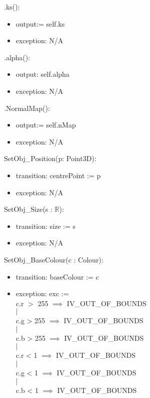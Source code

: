\documentclass[12pt, titlepage]{article}
\begin{document}
\noindent .ks():
\begin{itemize}
	\item output:= self.ks
	\item exception: N/A
\end{itemize}

\noindent .alpha():
\begin{itemize}
	\item output: self.alpha
	\item exception: N/A
\end{itemize}

\noindent .NormalMap():
\begin{itemize}
	\item output:= self.nMap
	\item exception: N/A
\end{itemize}
\noindent SetObj\_Position(p: Point3D):
\begin{itemize}
	\item transition: centrePoint := p
	\item exception: N/A
\end{itemize}

\noindent SetObj\_Size(s : $\mathbb{R}$):
\begin{itemize}
	\item transition: size := s
	\item exception: N/A
\end{itemize}

\noindent SetObj\_BaseColour(c : Colour):
\begin{itemize}
	\item transition: baseColour := c
	\item exception: exc := {\\
					c.r $>$ 255 $\implies$ IV\_OUT\_OF\_BOUNDS\\
					$|$ \\
					c.g > 255 $\implies$ IV\_OUT\_OF\_BOUNDS \\
					$|$ \\
					c.b > 255 $\implies$ IV\_OUT\_OF\_BOUNDS\\
					$|$ \\
					c.r < 1 $\implies$ IV\_OUT\_OF\_BOUNDS\\
					$|$ \\
					c.g < 1 $\implies$ IV\_OUT\_OF\_BOUNDS \\
					$|$ \\
					c.b < 1 $\implies$ IV\_OUT\_OF\_BOUNDS}	\\	
\end{itemize} 
\end{document}
